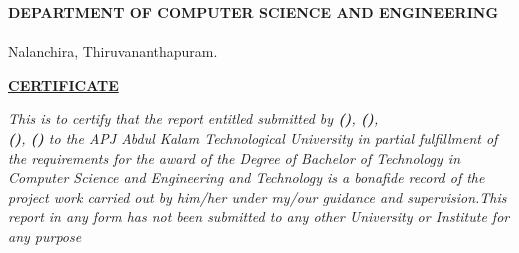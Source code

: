 
\setlength{\headsep}{0.4in}
\begin{center}

{\sf \textbf{\textcolor[rgb]{0,0,0}{DEPARTMENT OF COMPUTER SCIENCE AND ENGINEERING}}}\\[0.5ex]
{}\\[0.4ex]
Nalanchira, Thiruvananthapuram.



\end{center}


\vspace{0.15cm}
 \begin{figure}[!h]
 \begin{center}
 \end{center}
 \end{figure}
\vspace{0.02cm}

\begin{center}
\textcolor[rgb]{0,0,0}{\textbf{\underline{CERTIFICATE}}} \\[1ex]
\end{center}
\par

\emph{
\textit{{This is to certify that the report entitled \textbf{\projectName}  submitted by \textbf{\firstAuthor(\firstAuthorRegNo)},
		\textbf{\secondAuthor(\secondAuthorRegNo)},
		\textbf{\thirdAuthor \\ (\thirdAuthorRegNo)},
		\textbf{\fourthAuthor(\fourthAuthorRegNo)}
		 to the APJ Abdul Kalam Technological University in partial fulfillment of the
		requirements for the award of the Degree of {Bachelor of Technology} in {Computer Science and Engineering and Technology} is a bonafide record of the project work carried out by him/her under my/our guidance and supervision.This report in any form has not been submitted to any other University or Institute for any purpose}}} 



